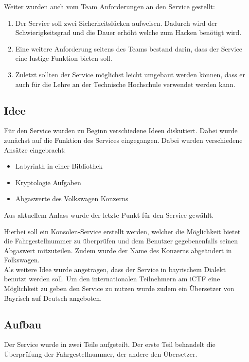 Weiter wurden auch vom Team Anforderungen an den Service gestellt:
\begin{enumerate}
\item Der Service soll zwei Sicherheitslücken aufweisen. Dadurch wird der Schwierigkeitsgrad und die Dauer erhöht welche zum Hacken benötigt wird.
\item Eine weitere Anforderung seitens des Teams bestand darin, dass der Service eine lustige Funktion bieten soll.
\item Zuletzt sollten der Service möglichst leicht umgebaut werden können, dass er auch für die Lehre an der Technische Hochschule verwendet werden kann.
\end{enumerate}


\subsection{Idee}
Für den Service wurden zu Beginn verschiedene Ideen diskutiert. Dabei wurde zunächst auf die Funktion des Services eingegangen. Dabei wurden verschiedene Ansätze eingebracht:

\begin{itemize}
\item Labyrinth in einer Bibliothek
\item Kryptologie Aufgaben 
\item Abgaswerte des Volkswagen Konzerns
\end{itemize}

Aus aktuellem Anlass wurde  der letzte Punkt für den Service gewählt.

Hierbei soll ein Konsolen-Service erstellt werden, welcher die Möglichkeit bietet die Fahrgestellnummer zu überprüfen und dem Benutzer gegebenenfalls seinen Abgaswert mitzuteilen. Zudem wurde der Name des Konzerns abgeändert in Folkswagen.
\\

Als weitere Idee wurde angetragen, dass der Service in bayrischem Dialekt benutzt werden soll. Um den internationalen Teilnehmern am iCTF eine Möglichkeit zu geben den Service zu nutzen wurde zudem ein Übersetzer von Bayrisch auf Deutsch angeboten. 

\subsection{Aufbau}
Der Service wurde in zwei Teile aufgeteilt. Der erste Teil behandelt die Überprüfung der Fahrgestellnummer, der andere den Übersetzer.

